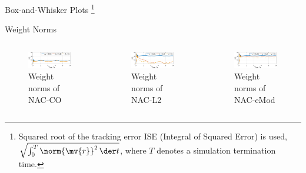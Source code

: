 \documentclass[8pt, aspectratio=169]{beamer}
\begin{document}
\begin{frame}{\insertsubsectionhead}{Box-and-Whisker Plots}
    \let\thefootnote\relax\footnote{
      Squared root of the tracking error ISE (Integral of Squared Error) is used, \ie $\sqrt{\int_0^T \norm{\mv{r}}^2\,\der t}$, where $T$ denotes a simulation termination time.
    }
    
\end{frame}

\begin{frame}{\insertsubsectionhead}{Weight Norms}

  \begin{columns}


      \begin{figure}
        \includegraphics[width=0.99\textwidth]{figures/ECC/fig8.eps}
        \caption{Weight norms of NAC-CO}
      \end{figure}


      \begin{figure}      
        \includegraphics[width=0.99\textwidth]{figures/ECC/fig9.eps}
        \caption{Weight norms of NAC-L2}
      \end{figure}
      

      \begin{figure}
        \includegraphics[width=0.99\textwidth]{figures/ECC/fig10.eps}
        \caption{Weight norms of NAC-eMod}
      \end{figure}
    

\end{columns}
\end{frame}
\end{document}
